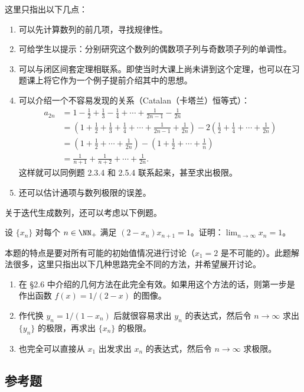 这里只指出以下几点：
\begin{enumerate}[label=\arabic*.]
  \item 可以先计算数列的前几项，寻找规律性。
  \item 可给学生以提示：分别研究这个数列的偶数项子列与奇数项子列的单调性。
  \item 可以与闭区间套定理相联系。即使当时大课上尚未讲到这个定理，也可以在习题课上将它作为一个例子提前介绍其中的思想。
  \item 可以介绍一个不容易发现的关系（Catalan（卡塔兰）恒等式）：
  \begin{align*}
    a_{2n}
    &=1-\frac12+\frac13-\frac14+\cdots+\frac1{2n-1}-\frac1{2n}\\
    &=\left(1+\frac12+\frac13+\frac14+\cdots+\frac1{2n-1}+\frac1{2n}\right)
      -2\left(\frac12+\frac14+\cdots+\frac1{2n}\right)\\
    &=\left(1+\frac12+\cdots+\frac1{2n}\right)
      -\left(1+\frac12+\cdots+\frac1n\right)\\
    &=\frac1{n+1}+\frac1{n+2}+\cdots+\frac1{2n}.
  \end{align*}
  这样就可以同例题 2.3.4 和 2.5.4 联系起来，甚至求出极限。
  \item 还可以估计通项与数列极限的误差。
\end{enumerate}

关于迭代生成数列，还可以考虑以下例题。

\begin{xexample}[2.7.4]
设 $\{x_n\}$ 对每个 $n\in\NN_+$ 满足 $(2-x_n)x_{n+1}=1$。证明：$\displaystyle\lim_{n\to\infty}x_n=1$。
\end{xexample}

本题的特点是要对所有可能的初始值情况进行讨论（$x_1=2$ 是不可能的）。此题解法很多，这里只指出以下几种思路完全不同的方法，并希望展开讨论。
\begin{enumerate}[label=\arabic*.]
  \item 在 §2.6 中介绍的几何方法在此完全有效。如果用这个方法的话，则第一步是作出函数 $f(x)=1/(2-x)$ 的图像。
  \item 作代换 $y_n=1/(1-x_n)$ 后就很容易求出 $y_n$ 的表达式，然后令 $n\to\infty$ 求出 $\{y_n\}$ 的极限，再求出 $\{x_n\}$ 的极限。
  \item 也完全可以直接从 $x_1$ 出发求出 $x_n$ 的表达式，然后令 $n\to\infty$ 求极限。
\end{enumerate}

\subsection{参考题}

